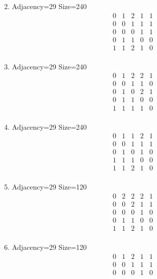 \documentclass[12pt]{article}
\begin{document}
\begin{multicols}{3}
\begin{enumerate}
\begin{equation*}
\end{equation*}
\item Adjacency=29 Size=240
\begin{equation*}
\begin{array}{ccccc}
0&1&2&1&1\\
0&0&1&1&1\\
0&0&0&1&1\\
0&1&1&0&0\\
1&1&2&1&0\\
\end{array}
\end{equation*}
\item Adjacency=29 Size=240
\begin{equation*}
\begin{array}{ccccc}
0&1&2&2&1\\
0&0&1&1&0\\
0&1&0&2&1\\
0&1&1&0&0\\
1&1&1&1&0\\
\end{array}
\end{equation*}
\item Adjacency=29 Size=240
\begin{equation*}
\begin{array}{ccccc}
0&1&1&2&1\\
0&0&1&1&1\\
0&1&0&1&0\\
1&1&1&0&0\\
1&1&2&1&0\\
\end{array}
\end{equation*}
\item Adjacency=29 Size=120
\begin{equation*}
\begin{array}{ccccc}
0&2&2&2&1\\
0&0&2&1&1\\
0&0&0&1&0\\
0&1&1&0&0\\
1&1&2&1&0\\
\end{array}
\end{equation*}
\item Adjacency=29 Size=120
\begin{equation*}
\begin{array}{ccccc}
0&1&2&1&1\\
0&0&1&1&1\\
0&0&0&1&0\\

\end{array}
\end{equation*}
\end{enumerate}
\end{multicols}
\end{document}
